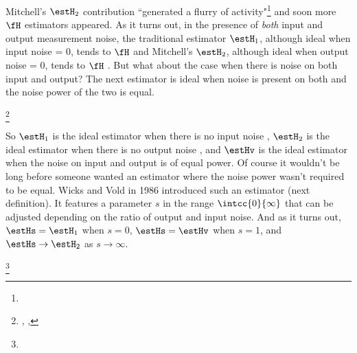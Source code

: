Mitchell's $\estH_2$ contribution ``generated a flurry of activity"\footnote{}
and soon more $\fH$ estimators appeared. 
As it turns out, in the presence of \emph{both} input and output measurement noise,
the traditional estimator $\estH_1$, although ideal when input noise = 0, tends to  $\fH$ 
and Mitchell's $\estH_2$, although ideal when output noise = 0, 
tends to  $\fH$ .
But what about the case when there is noise on both input and output?
The next estimator is ideal when noise is present on both and the noise power of the two is equal.
\begin{definition}
\footnote{
  ,
  ,
  }
\label{def:Hv}
\end{definition}

So $\estH_1$ is the ideal estimator when there is no input noise ,
$\estH_2$ is the ideal estimator when there is no output noise ,
and $\estHv$ is the ideal estimator when the noise on input and output is of equal power.
Of course it wouldn't be long before someone wanted an estimator 
where the noise power wasn't required to be equal.
Wicks and Vold in 1986 introduced such an estimator (next definition).
It features a parameter $s$ in the range $\intcc{0}{\infty}$
that can be adjusted depending on the ratio of output and input noise.
And as it turns out, $\estHs = \estH_1$ when $s=0$, $\estHs=\estHv$ when $s=1$, and 
$\estHs\to\estH_2$ as $s\to\infty$. %
\begin{definition}
\footnote{
  }
\label{def:Hs}
\end{definition}

